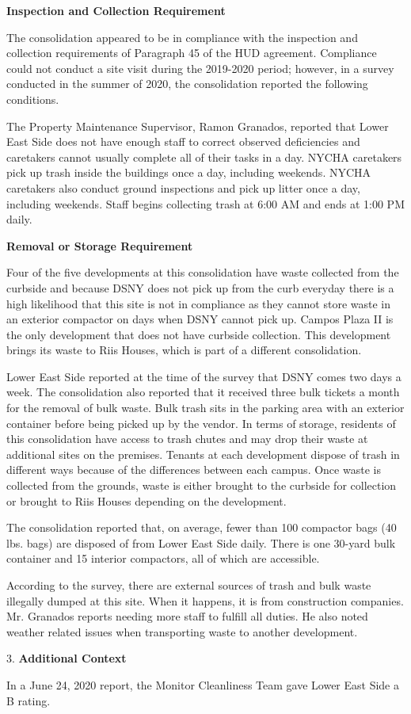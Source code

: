 

\textbf{Inspection and Collection Requirement}

The consolidation appeared to be in compliance with the inspection and collection requirements of Paragraph 45 of the HUD agreement. Compliance could not conduct a site visit during the 2019-2020 period; however, in a survey conducted in the summer of 2020, the consolidation reported the following conditions.

The Property Maintenance Supervisor, Ramon Granados, reported that Lower East Side does not have enough staff to correct observed deficiencies and caretakers cannot usually complete all of their tasks in a day. NYCHA caretakers pick up trash inside the buildings once a day, including weekends. NYCHA caretakers also conduct ground inspections and pick up litter once a day, including weekends. Staff begins collecting trash at 6:00 AM and ends at 1:00 PM daily. 

\textbf{Removal or Storage Requirement}

Four of the five developments at this consolidation have waste collected from the curbside and because DSNY does not pick up from the curb everyday there is a high likelihood that this site is not in compliance as they cannot store waste in an exterior compactor on days when DSNY cannot pick up. Campos Plaza II is the only development that does not have curbside collection. This development brings its waste to Riis Houses, which is part of a different consolidation.

Lower East Side reported at the time of the survey that DSNY comes two days a week. The consolidation also reported that it received three bulk tickets a month for the removal of bulk waste.  Bulk trash sits in the parking area with an exterior container before being picked up by the vendor. In terms of storage, residents of this consolidation have access to trash chutes and may drop their waste at  additional sites on the premises. Tenants at each development dispose of trash in different ways because of the differences between each campus. Once waste is collected from the grounds, waste is either brought to the curbside for collection or brought to Riis Houses depending on the development. 

The consolidation reported that, on average, fewer than 100 compactor bags (40 lbs. bags)  are disposed of from Lower East Side daily. There is one 30-yard bulk container and 15 interior compactors, all of which are accessible. 

According to the survey, there are external sources of trash and bulk waste illegally dumped at this site. When it happens, it is from construction companies. Mr. Granados reports needing more staff to fulfill all duties. He also noted weather related issues when transporting waste to another development. 

3. \textbf{Additional Context} 

In a June 24, 2020 report, the Monitor Cleanliness Team gave Lower East Side a B rating. 